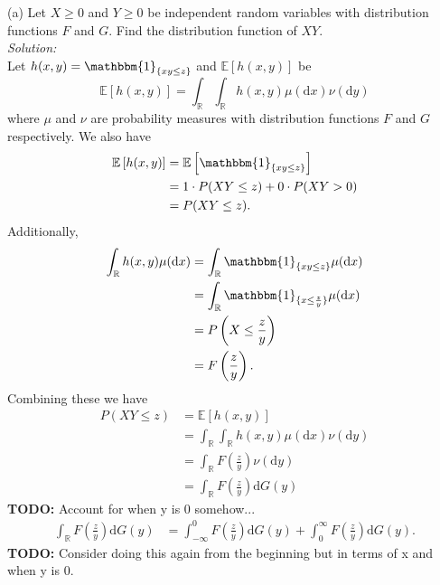 \documentclass[10pt]{amsart}
\newcommand{\D}{\mathrm{d}}
\begin{document}
  (a) Let $X \geq 0$ and $Y \geq 0$  be independent random variables with distribution functions $F$ and $G$. Find the distribution function of $XY$. \\
\textit{Solution:} \\
Let $h(x, y) = \mathbbm{1}_{\{xy \leq z\}}$ and $\mathbb E \left[ h(x,y) \right]$ be
$$
\mathbb E \left[ h(x,y) \right] = \int_{\mathbb R} \int_{\mathbb R} h(x, y) \mu(\D x) \nu(\D y)
$$
where $\mu$ and $\nu$ are probability measures with distribution functions $F$ and $G$ respectively.
We also have 
\begin{align*}
\mathbb E \left[ h(x,y) \right]
	&= \mathbb E \left[ \mathbbm{1}_{\{xy \leq z\}} \right] \\
	&= 1 \cdot P(XY \leq z) + 0 \cdot P(XY > 0) \\
	&= P(XY \leq z).
\end{align*}
Additionally,
\begin{align*}
\int_{\mathbb R} h(x, y) \mu(\D x) 
	&= \int_{\mathbb R} \mathbbm{1}_{\{xy \leq z\}} \mu(\D x) \\
	&= \int_{\mathbb R} \mathbbm{1}_{\{x \leq \frac z y\}} \mu(\D x) \\
	&= P\left( X \leq \frac z y \right) \\
	&= F\left(\frac z y \right).
\end{align*}
Combining these we have
\begin{align*}
P\left( XY \leq z \right)
	&= \mathbb E \left[ h(x,y) \right] \\
	&= \int_{\mathbb R} \int_{\mathbb R} h(x, y) \mu(\D x) \nu(\D y) \\
	&= \int_{\mathbb R} F\left(\frac z y \right) \nu(\D y) \\
	&= \int_{\mathbb R} F\left(\frac z y \right) \D G(y)
\end{align*}
\textbf{TODO:} Account for when y is 0 somehow...
\begin{align*}
\int_{\mathbb R} F\left(\frac z y \right) \D G(y)
	&= \int_{-\infty}^0 F\left(\frac z y \right) \D G(y) + \int_{0}^{\infty} F\left(\frac z y \right) \D G(y).
\end{align*}
\textbf{TODO:} Consider doing this again from the beginning but in terms of x and when y is 0.
\\
\end{document}
